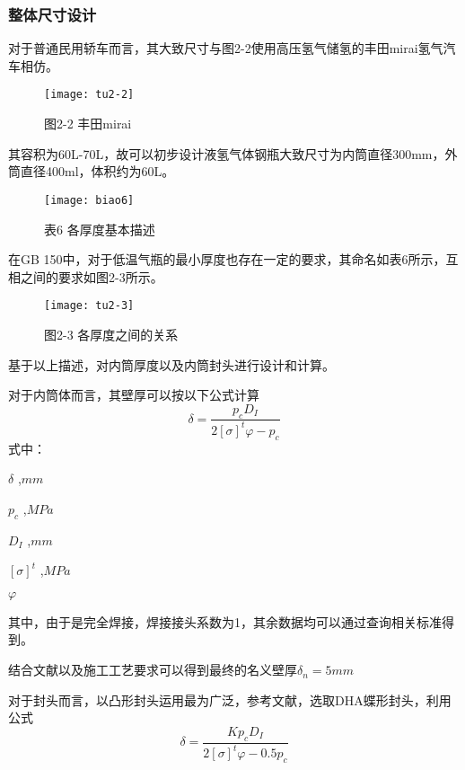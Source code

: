 \documentclass[UTF8,a4paper]{ctexart}
\newcommand{\upcite}[1]{\textsuperscript{\textsuperscript{\cite{#1}}}}
\begin{document}
	\subsubsection{整体尺寸设计}
	对于普通民用轿车而言，其大致尺寸与图2-2使用高压氢气储氢的丰田mirai氢气汽车相仿。
	
	\begin{figure}[H]
		\centering
		\texttt{[image: tu2-2]}
		\caption*{图2-2 丰田mirai}
		\label{fig:tu2-2}
	\end{figure}
	
	
	其容积为60L-70L，故可以初步设计液氢气体钢瓶大致尺寸为内筒直径300mm，外筒直径400ml，体积约为60L。
	
	\begin{figure}[H]
		\centering
		\texttt{[image: biao6]}
		\caption*{表6 各厚度基本描述}
		\label{fig:biao6}
	\end{figure}
	
	
	在GB 150中，对于低温气瓶的最小厚度也存在一定的要求，其命名如表6所示，互相之间的要求如图2-3所示\upcite{ref10}。
	
	\begin{figure}[H]
		\centering
		\texttt{[image: tu2-3]}
		\caption*{图2-3 各厚度之间的关系}
		\label{fig:tu2-3}
	\end{figure}
	
	
	基于以上描述，对内筒厚度以及内筒封头进行设计和计算。
	
	对于内筒体而言，其壁厚可以按以下公式计算
	\begin{equation*}
	\delta=\dfrac{p_{c}D_{I}}{2[\sigma]^{t}\varphi-p_{c}}
	\end{equation*}
	式中：
	
	$\delta$ ,$mm$
	
	$p_{c}$ ,$MPa$
	
	$D_{I}$ ,$mm$
	
	$[\sigma]^{t}$ ,$MPa$
	
	$\varphi$ 
	
	其中，由于是完全焊接，焊接接头系数为1，其余数据均可以通过查询相关标准得到。
	
	结合文献\upcite{ref11}以及施工工艺要求可以得到最终的名义壁厚$\delta_{n}=5mm$
	
	对于封头而言，以凸形封头运用最为广泛，参考文献，选取DHA蝶形封头，利用公式
	\begin{equation*}
	\delta=\dfrac{Kp_{c}D_{I}}{2[\sigma]^{t}\varphi-0.5p_{c}}
	\end{equation*}
	
\end{document}
